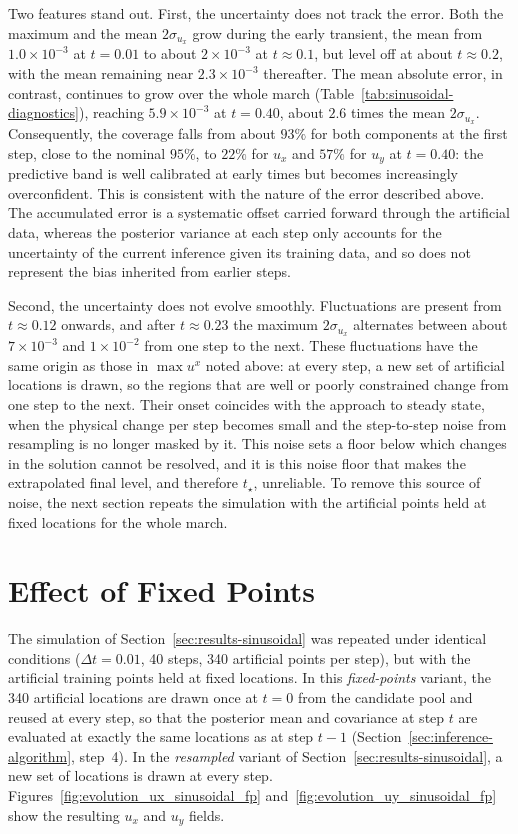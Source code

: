 \documentclass[11pt, a4paper]{report}
\begin{document}
Two features stand out. First, the uncertainty does not track the error. Both the
maximum and the mean \(2\sigma_{u_x}\) grow during the early transient, the mean from
\(1.0\times10^{-3}\) at \(t=0.01\) to about \(2\times10^{-3}\) at \(t \approx 0.1\), but
level off at about \(t \approx 0.2\), with the mean remaining near
\(2.3\times10^{-3}\) thereafter. The mean absolute error, in contrast, continues to
grow over the whole march (Table~\ref{tab:sinusoidal-diagnostics}), reaching
\(5.9\times10^{-3}\) at \(t=0.40\), about \(2.6\) times the mean \(2\sigma_{u_x}\).
Consequently, the coverage falls from about \(93\%\) for both components at the first
step, close to the nominal \(95\%\), to \(22\%\) for \(u_x\) and \(57\%\) for \(u_y\)
at \(t=0.40\): the predictive band is well calibrated at early times but becomes
increasingly overconfident. This is consistent with the nature of the error described
above. The accumulated error is a systematic offset carried forward through the
artificial data, whereas the posterior variance at each step only accounts for the
uncertainty of the current inference given its training data, and so does not
represent the bias inherited from earlier steps.

Second, the uncertainty does not evolve smoothly. Fluctuations are present from
\(t \approx 0.12\) onwards, and after \(t \approx 0.23\) the maximum
\(2\sigma_{u_x}\) alternates between about \(7\times10^{-3}\) and
\(1\times10^{-2}\) from one step to the next. These fluctuations have the same origin
as those in \(\max u^x\) noted above: at every step, a new set of artificial locations
is drawn, so the regions that are well or poorly constrained change from one step to
the next. Their onset coincides with the approach to steady state, when the physical
change per step becomes small and the step-to-step noise from resampling is no
longer masked by it. This noise sets a floor below which changes in the solution
cannot be resolved, and it is this noise floor that makes the extrapolated final
level, and therefore \(t_\star\), unreliable. To remove this source of noise, the next
section repeats the simulation with the artificial points held at fixed locations for
the whole march.

\section{Effect of Fixed Points}%
\label{sec:fixed-points-comparison}

The simulation of Section~\ref{sec:results-sinusoidal} was repeated under identical
conditions (\(\Delta t = 0.01\), 40 steps, 340 artificial points per step), but with
the artificial training points held at fixed locations. In this \emph{fixed-points}
variant, the 340 artificial locations are drawn once at \(t=0\) from the candidate
pool and reused at every step, so that the posterior mean and covariance at step \(t\)
are evaluated at exactly the same locations as at step \(t-1\)
(Section~\ref{sec:inference-algorithm}, step~4). In the \emph{resampled} variant of
Section~\ref{sec:results-sinusoidal}, a new set of locations is drawn at every step.
Figures~\ref{fig:evolution_ux_sinusoidal_fp} and~\ref{fig:evolution_uy_sinusoidal_fp}
show the resulting \(u_x\) and \(u_y\) fields.
\end{document}
